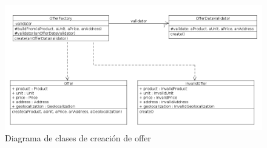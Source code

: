 \begin{figure}[h]
\centerline{\includegraphics[width=0.9\paperwidth]{./imgs/class_diagram_Offer_Factory.png}}
\caption{Diagrama de clases de creaci\'on de offer}
\label{fig:class_Offer_Factory}
\end{figure}

